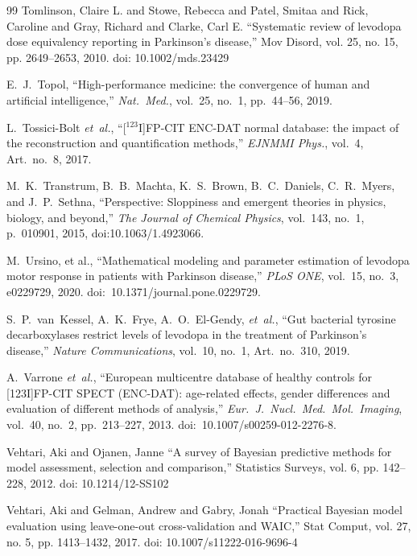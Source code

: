 \begin{thebibliography}{99}
 Tomlinson, Claire L. and Stowe, Rebecca and Patel, Smitaa and Rick, Caroline and Gray, Richard and Clarke, Carl E. ``Systematic review of levodopa dose equivalency reporting in Parkinson's disease,'' Mov Disord, vol. 25, no. 15, pp. 2649--2653, 2010. doi: 10.1002/mds.23429

E.~J.~Topol, ``High-performance medicine: the convergence of human and artificial intelligence,'' \textit{Nat.\ Med.}, vol.~25, no.~1, pp.~44--56, 2019.

L.~Tossici-Bolt \textit{et~al.}, ``[$^{123}$I]FP-CIT ENC-DAT normal database: the impact of the reconstruction and quantification methods,'' \textit{EJNMMI Phys.}, vol.~4, Art.\ no.~8, 2017.

M.~K.~Transtrum, B.~B.~Machta, K.~S.~Brown, B.~C.~Daniels, C.~R.~Myers, and J.~P.~Sethna, ``Perspective: Sloppiness and emergent theories in physics, biology, and beyond,'' \textit{The Journal of Chemical Physics}, vol.~143, no.~1, p.~010901, 2015, doi:10.1063/1.4923066.


M.~Ursino, et al., ``Mathematical modeling and parameter estimation of levodopa motor response in patients with Parkinson disease,'' \textit{PLoS ONE}, vol.~15, no.~3, e0229729, 2020. doi:~10.1371/journal.pone.0229729.

S.~P.~van~Kessel, A.~K.~Frye, A.~O.~El-Gendy, \textit{et~al.}, ``Gut bacterial tyrosine decarboxylases restrict levels of levodopa in the treatment of Parkinson's disease,'' \textit{Nature Communications}, vol.~10, no.~1, Art.\ no.~310, 2019.

A.~Varrone \textit{et~al.}, ``European multicentre database of healthy controls for [123I]FP-CIT SPECT (ENC-DAT): age-related effects, gender differences and evaluation of different methods of analysis,'' \textit{Eur.\ J.\ Nucl.\ Med.\ Mol.\ Imaging}, vol.~40, no.~2, pp.~213--227, 2013. doi:~10.1007/s00259-012-2276-8.

 Vehtari, Aki and Ojanen, Janne ``A survey of Bayesian predictive methods for model assessment, selection and comparison,'' Statistics Surveys, vol. 6, pp. 142--228, 2012. doi: 10.1214/12-SS102

 Vehtari, Aki and Gelman, Andrew and Gabry, Jonah ``Practical Bayesian model evaluation using leave-one-out cross-validation and WAIC,'' Stat Comput, vol. 27, no. 5, pp. 1413--1432, 2017. doi: 10.1007/s11222-016-9696-4


\end{thebibliography}
